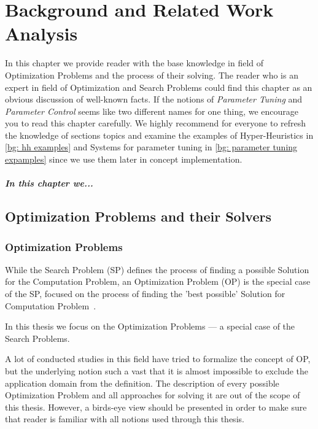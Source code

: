 \chapter{Background and Related Work Analysis}\label{bg}
In this chapter we provide reader with the base knowledge in field of Optimization Problems and the process of their solving.
The reader who is an expert in field of Optimization and Search Problems could find this chapter as an obvious discussion of well-known facts. If the notions of \textit{Parameter Tuning} and \textit{Parameter Control} seems like two different names for one thing, we encourage you to read this chapter carefully.
We highly recommend for everyone to refresh the knowledge of sections topics and examine the examples of Hyper-Heuristics in \ref{bg: hh examples} and Systems for parameter tuning in \ref{bg: parameter tuning expamples} since we use them later in concept implementation.

\paragraph{In this chapter we...} 


\section{Optimization Problems and their Solvers}\label{bg:opt problems and solvers}


\subsection{Optimization Problems}\label{BG: subsection OPs}
While the Search Problem (SP) defines the process of finding a possible Solution for the Computation Problem, an Optimization Problem (OP) is the special case of the SP, focused on the process of finding the 'best possible' Solution for Computation Problem~\cite{goldreich2010p}. 


In this thesis we focus on the Optimization Problems — a special case of the Search Problems.


A lot of conducted studies in this field have tried to formalize the concept of OP, but the underlying notion such a vast that it is almost impossible to exclude the application domain from the definition. The description of every possible Optimization Problem and all approaches for solving it are out of the scope of this thesis. However, a birds-eye view should be presented in order to make sure that reader is familiar with all notions used through this thesis. 


